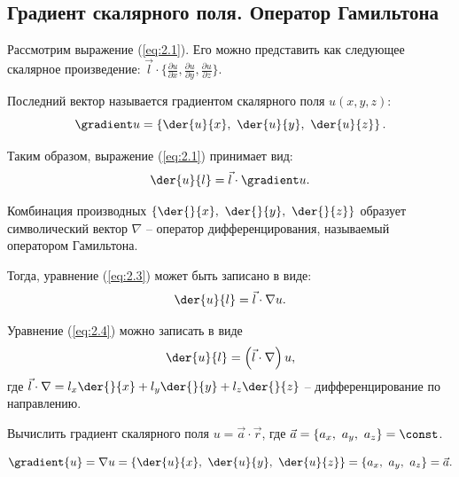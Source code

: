 \subsection{Градиент скалярного поля. Оператор Гамильтона}

    Рассмотрим выражение (\ref{eq:2.1}). Его можно представить как следующее скалярное произведение: \( \vec{l}\cdot\{\frac{\partial u}{\partial x}, \frac{\partial u}{\partial y}, \frac{\partial u}{\partial z}\} \).
    
    Последний вектор называется градиентом скалярного поля \( u(x,y,z) \):
    \begin{equation}
        \gradient u = \left\{\der{u}{x},\ \der{u}{y},\ \der{u}{z}\right\}.
        \label{eq:2.2}
    \end{equation}
    
    Таким образом, выражение (\ref{eq:2.1}) принимает вид:
    \begin{equation}
        \der{u}{l} = \vec{l}\cdot\gradient u.
        \label{eq:2.3}
    \end{equation}
    
    Комбинация производных \( \left\{ \der{}{x},\ \der{}{y},\ \der{}{z}\right\} \) образует символический вектор \( \nabla \) -- оператор дифференцирования, называемый оператором Гамильтона.
    
    Тогда, уравнение (\ref{eq:2.3}) может быть записано в виде:
    \begin{equation}
          \der{u}{l} = \vec{l}\cdot\nabla u. \label{eq:2.4}
    \end{equation}
    
    \begin{remark}
    Уравнение (\ref{eq:2.4}) можно записать в виде
    \begin{equation}
         \der{u}{l} = \left(\vec{l}\cdot\nabla\right)u, \label{eq:2.5}
    \end{equation}
    где \( \vec{l}\cdot\nabla = l_x\der{}{x} + l_y\der{}{y} + l_z\der{}{z} \) -- дифференцирование по направлению.
    \end{remark}
    
    \begin{example}
    Вычислить градиент скалярного поля \( u = \vec{a}\cdot\vec{r} \), где \( \vec{a} = \{ a_x,\ a_y,\ a_z \} = \const \).
    \end{example}    
    
    \begin{solution}
    
    \[ \gradient{u} = \nabla u = \left\{ \der{u}{x},\ \der{u}{y},\ \der{u}{z} \right\} = \{ a_x,\ a_y,\ a_z \} = \vec{a}. \]
    \end{solution}
    
